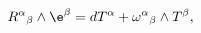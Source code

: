 \begin{equation}
{R^\alpha}_\beta\wedge\e^\beta=dT^\alpha+{\omega^\alpha}_\beta\wedge T^\beta,
\end{equation}

